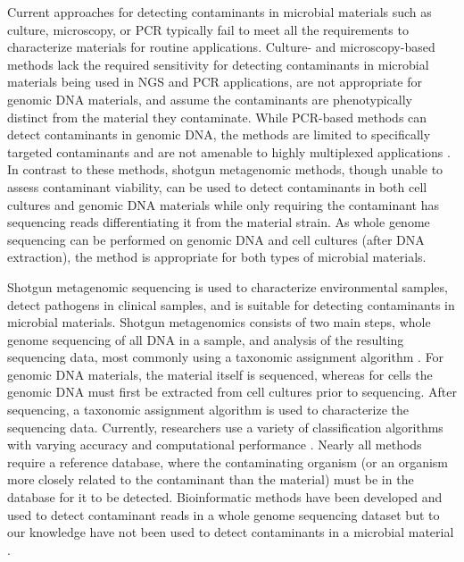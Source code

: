\documentclass[fleqn,10pt,lineno]{wlpeerj}\usepackage[]{graphicx}\usepackage[]{color}
\begin{document}
Current approaches for detecting contaminants in microbial materials such as culture, microscopy, or PCR typically fail to meet all the requirements to characterize materials for routine applications. 
Culture- and microscopy-based methods lack the required sensitivity for detecting contaminants in microbial materials being used in NGS and PCR applications, are not appropriate for genomic DNA materials, and assume the contaminants are phenotypically distinct from the material they contaminate. 
While PCR-based methods can detect contaminants in genomic DNA, the methods are limited to specifically targeted contaminants and are not amenable to highly multiplexed applications \citep{heck2016evaluating,Marron2013}. 
In contrast to these methods, shotgun metagenomic methods, though unable to assess contaminant viability, can be used to detect contaminants in both cell cultures and genomic DNA materials while only requiring the contaminant has sequencing reads differentiating it from the material strain. 
As whole genome sequencing can be performed on genomic DNA and cell cultures (after DNA extraction), the method is appropriate for both types of microbial materials.  

Shotgun metagenomic sequencing is used to characterize environmental samples, detect pathogens in clinical samples, and is suitable for detecting contaminants in microbial materials.
Shotgun metagenomics consists of two main steps, whole genome sequencing of all DNA in a sample, and analysis of the resulting sequencing data, most commonly using a taxonomic assignment algorithm \citep{Thomas2012}.
For genomic DNA materials, the material itself is sequenced, whereas for cells the genomic DNA must first be extracted from cell cultures prior to sequencing.
After sequencing, a taxonomic assignment algorithm is used to characterize the sequencing data.
Currently, researchers use a variety of classification algorithms with varying accuracy and computational performance \citep{Bazinet2012,menzel2016fast,sczyrba2017critical}.
Nearly all methods require a reference database, where the contaminating organism (or an organism more closely related to the contaminant than the material) must be in the database for it to be detected. 
Bioinformatic methods have been developed and used to detect contaminant reads in a whole genome sequencing dataset but to our knowledge have not been used to detect contaminants in a microbial material \citep{kumar2013blobology,delmont2016identifying}. 
\end{document}
